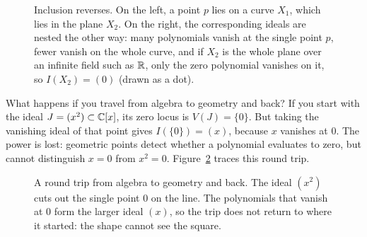 \begin{figure}[htbp]
\caption{Inclusion reverses. On the left, a point $p$ lies on a curve $X_1$, which lies in the plane $X_2$. On the right, the corresponding ideals are nested the other way: many polynomials vanish at the single point $p$, fewer vanish on the whole curve, and if $X_2$ is the whole plane over an infinite field such as $\mathbb{R}$, only the zero polynomial vanishes on it, so $I(X_2) = (0)$ (drawn as a dot).}
\label{24:fig-inclusion-reversal}
\end{figure}

What happens if you travel from algebra to geometry and back? If you start with the ideal $J = (x^2) \subset \mathbb{C}[x]$, its zero locus is $V(J) = \{0\}$. But taking the vanishing ideal of that point gives $I(\{0\}) = (x)$, because $x$ vanishes at $0$. The power is lost: geometric points detect whether a polynomial evaluates to zero, but cannot distinguish $x = 0$ from $x^2 = 0$. Figure~\ref{24:fig-round-trip} traces this round trip.

\begin{figure}[htbp]
\centering
{}
\caption{A round trip from algebra to geometry and back. The ideal $(x^2)$ cuts out the single point $0$ on the line. The polynomials that vanish at $0$ form the larger ideal $(x)$, so the trip does not return to where it started: the shape cannot see the square.}
\label{24:fig-round-trip}
\end{figure}


